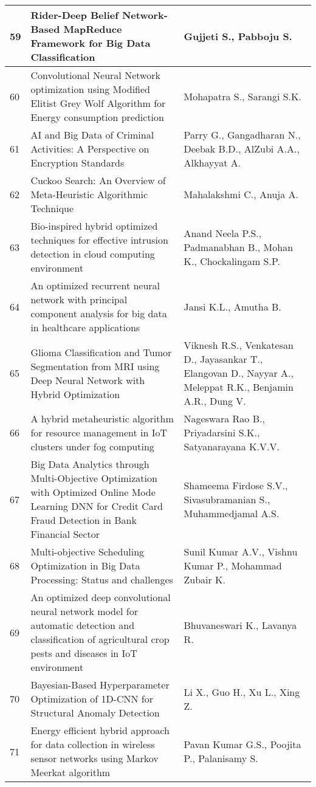 \begin{longtable}{|p{}|p{}|p{}|}
\hline
59 & Rider-Deep Belief Network-Based MapReduce Framework for Big Data Classification & Gujjeti S., Pabboju S. \\
\hline
60 & Convolutional Neural Network optimization using Modified Elitist Grey Wolf Algorithm for Energy consumption prediction & Mohapatra S., Sarangi S.K. \\
\hline
61 & AI and Big Data of Criminal Activities: A Perspective on Encryption Standards & Parry G., Gangadharan N., Deebak B.D., AlZubi A.A., Alkhayyat A. \\
\hline
62 & Cuckoo Search: An Overview of Meta-Heuristic Algorithmic Technique & Mahalakshmi C., Anuja A. \\
\hline
63 & Bio-inspired hybrid optimized techniques for effective intrusion detection in cloud computing environment & Anand Neela P.S., Padmanabhan B., Mohan K., Chockalingam S.P. \\
\hline
64 & An optimized recurrent neural network with principal component analysis for big data in healthcare applications & Jansi K.L., Amutha B. \\
\hline
65 & Glioma Classification and Tumor Segmentation from MRI using Deep Neural Network with Hybrid Optimization & Viknesh R.S., Venkatesan D., Jayasankar T., Elangovan D., Nayyar A., Meleppat R.K., Benjamin A.R., Dung V. \\
\hline
66 & A hybrid metaheuristic algorithm for resource management in IoT clusters under fog computing & Nageswara Rao B., Priyadarsini S.K., Satyanarayana K.V.V. \\
\hline
67 & Big Data Analytics through Multi-Objective Optimization with Optimized Online Mode Learning DNN for Credit Card Fraud Detection in Bank Financial Sector & Shameema Firdose S.V., Sivasubramanian S., Muhammedjamal A.S. \\
\hline
68 & Multi-objective Scheduling Optimization in Big Data Processing: Status and challenges & Sunil Kumar A.V., Vishnu Kumar P., Mohammad Zubair K. \\
\hline
69 & An optimized deep convolutional neural network model for automatic detection and classification of agricultural crop pests and diseases in IoT environment & Bhuvaneswari K., Lavanya R. \\
\hline
70 & Bayesian-Based Hyperparameter Optimization of 1D-CNN for Structural Anomaly Detection & Li X., Guo H., Xu L., Xing Z. \\
\hline
71 & Energy efficient hybrid approach for data collection in wireless sensor networks using Markov Meerkat algorithm & Pavan Kumar G.S., Poojita P., Palanisamy S. \\

\end{longtable}
